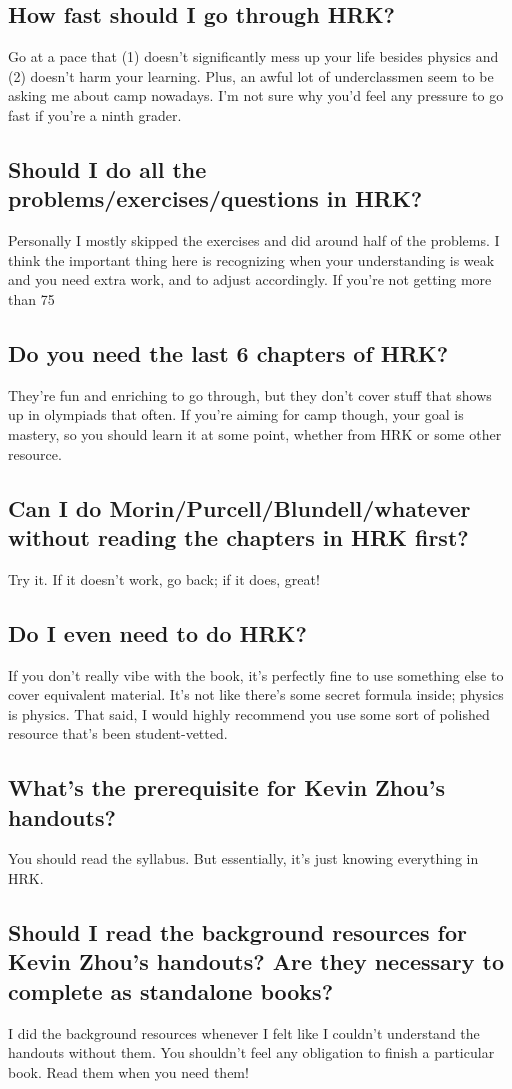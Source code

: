 \documentclass[11pt]{article}
\begin{document}
\subsection*{How fast should I go through HRK?}
Go at a pace that (1) doesn’t significantly mess up your life besides physics and (2) doesn’t harm your learning. Plus, an awful lot of underclassmen seem to be asking me about camp nowadays. I'm not sure why you'd feel any pressure to go fast if you're a ninth grader.
\subsection*{Should I do all the problems/exercises/questions in HRK?}
Personally I mostly skipped the exercises and did around half of the problems. I think the important thing here is recognizing when your understanding is weak and you need extra work, and to adjust accordingly. If you’re not getting more than 75%
\subsection*{Do you need the last 6 chapters of HRK?}
They’re fun and enriching to go through, but they don’t cover stuff that shows up in olympiads that often. If you’re aiming for camp though, your goal is mastery, so you should learn it at some point, whether from HRK or some other resource.
\subsection*{Can I do Morin/Purcell/Blundell/whatever without reading the chapters in HRK first?}
Try it. If it doesn’t work, go back; if it does, great!
\subsection*{Do I even need to do HRK?}
If you don’t really vibe with the book, it’s perfectly fine to use something else to cover equivalent material. It’s not like there’s some secret formula inside; physics is physics. That said, I would highly recommend you use some sort of polished resource that’s been student-vetted.
\subsection*{What’s the prerequisite for Kevin Zhou’s handouts?}
You should read the syllabus. But essentially, it’s just knowing everything in HRK.
\subsection*{Should I read the background resources for Kevin Zhou’s handouts? Are they necessary to complete as standalone books?}
I did the background resources whenever I felt like I couldn’t understand the handouts without them. You shouldn’t feel any obligation to finish a particular book. Read them when you need them!
\end{document}
